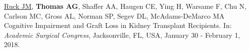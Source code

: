 \documentclass[10pt]{article}
\makeatletter
\newlength{\bibhang}
\newlength{\bibsep}
 {\@listi \global\bibsep\itemsep \global\advance\bibsep by\parsep}
\newenvironment{bibenum*}
  {\renewcommand\labelenumi{[\theenumi]}%
   \etaremune[
     topsep=0pt,
     itemsep=\bibsep,
     parsep=0pt,partopsep=0pt,
     itemindent=-\bibhang,
     leftmargin={\bibhang+\widthof{[999]}}]}
  {\endetaremune}
\makeatother
\begin{document}
\begin{bibenum*}





\item \underline{Ruck JM\dag}, \textbf{Thomas AG\dag}, Shaffer AA,
  Haugen CE, Ying H, Warsame F, Chu N, Carlson MC, Gross AL,
  Norman SP, Segev DL, McAdams-DeMarco MA
  Cognitive Impairment and Graft Loss
  in Kidney Transplant Recipients.
  In: \emph{Academic Surgical Congress},
  Jacksonville, FL, USA, January 30 - February 1, 2018.



\end{bibenum*}
\end{document}
